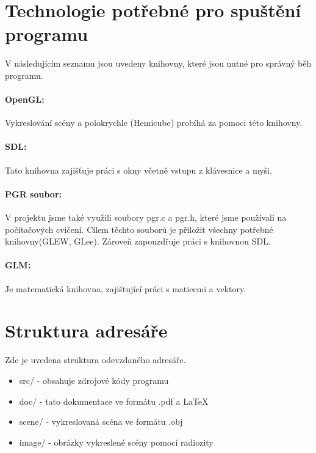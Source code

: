 \documentclass[12pt,a4paper,titlepage,final]{report}
\begin{document}
\section{Technologie potřebné pro spuštění programu}
V následujícím seznamu jsou uvedeny knihovny, které jsou nutné pro správný běh programu.

\paragraph{OpenGL:} Vykreslování scény a polokrychle (Hemicube) probíhá za pomoci této knihovny. 

\paragraph{SDL:} Tato knihovna zajišťuje práci s okny  včetně vstupu z klávesnice a myši.

\paragraph{PGR soubor:} V projektu jsme také využili soubory pgr.c a pgr.h, které jsme používali na počítačových cvičení. Cílem těchto souborů je přiložit všechny potřebné knihovny(GLEW, GLee). Zároveň zapouzdřuje práci s knihovnou SDL. 

\paragraph{GLM:} Je matematická knihovna, zajištující práci s maticemi a vektory. 


\section{Struktura adresáře}
Zde je uvedena struktura odevzdaného adresáře. 
\begin{itemize}
\item src/ - obsahuje zdrojové kódy programu
\item doc/ - tato dokumentace ve formátu .pdf a  {\LaTeX}
\item scene/ - vykreslovaná scéna ve formátu .obj 
\item image/ - obrázky vykreslené scény pomocí radiozity
\end{itemize}
\end{document}
